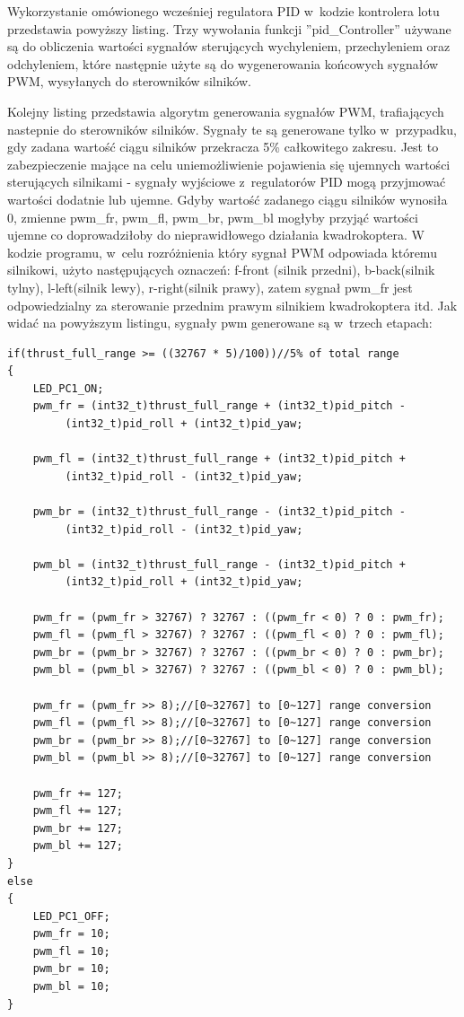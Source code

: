 Wykorzystanie omówionego wcześniej regulatora PID w~kodzie kontrolera lotu przedstawia powyższy listing. Trzy wywołania funkcji ''pid\_Controller'' używane są do obliczenia wartości sygnałów sterujących wychyleniem, przechyleniem oraz odchyleniem, które następnie użyte są do wygenerowania końcowych sygnałów PWM, wysyłanych do sterowników silników. 


Kolejny listing przedstawia algorytm generowania sygnałów PWM, trafiających nastepnie do sterowników silników. Sygnały te są generowane tylko w~przypadku, gdy zadana wartość ciągu silników przekracza 5\% całkowitego zakresu. Jest to zabezpieczenie mające na celu uniemożliwienie pojawienia się ujemnych wartości sterujących silnikami - sygnały wyjściowe z~regulatorów PID mogą przyjmować wartości dodatnie lub ujemne. Gdyby wartość zadanego ciągu silników wynosiła 0, zmienne pwm\_fr, pwm\_fl, pwm\_br, pwm\_bl mogłyby przyjąć wartości ujemne co doprowadziłoby do nieprawidłowego działania kwadrokoptera. W kodzie programu, w~celu rozróżnienia który sygnał PWM odpowiada któremu silnikowi, użyto następujących oznaczeń: f-front (silnik przedni), b-back(silnik tylny), l-left(silnik lewy), r-right(silnik prawy), zatem sygnał pwm\_fr jest odpowiedzialny za sterowanie przednim prawym silnikiem kwadrokoptera itd. Jak widać na powyższym listingu, sygnały pwm generowane są w~trzech etapach:

\begin{lstlisting}
if(thrust_full_range >= ((32767 * 5)/100))//5% of total range
{
	LED_PC1_ON;
	pwm_fr = (int32_t)thrust_full_range + (int32_t)pid_pitch - 
		 (int32_t)pid_roll + (int32_t)pid_yaw;
	
	pwm_fl = (int32_t)thrust_full_range + (int32_t)pid_pitch + 
		 (int32_t)pid_roll - (int32_t)pid_yaw;
	
	pwm_br = (int32_t)thrust_full_range - (int32_t)pid_pitch - 
		 (int32_t)pid_roll - (int32_t)pid_yaw;
	
	pwm_bl = (int32_t)thrust_full_range - (int32_t)pid_pitch + 
		 (int32_t)pid_roll + (int32_t)pid_yaw;

	pwm_fr = (pwm_fr > 32767) ? 32767 : ((pwm_fr < 0) ? 0 : pwm_fr); 
	pwm_fl = (pwm_fl > 32767) ? 32767 : ((pwm_fl < 0) ? 0 : pwm_fl); 
	pwm_br = (pwm_br > 32767) ? 32767 : ((pwm_br < 0) ? 0 : pwm_br);
	pwm_bl = (pwm_bl > 32767) ? 32767 : ((pwm_bl < 0) ? 0 : pwm_bl);

	pwm_fr = (pwm_fr >> 8);//[0~32767] to [0~127] range conversion
	pwm_fl = (pwm_fl >> 8);//[0~32767] to [0~127] range conversion
	pwm_br = (pwm_br >> 8);//[0~32767] to [0~127] range conversion
	pwm_bl = (pwm_bl >> 8);//[0~32767] to [0~127] range conversion

	pwm_fr += 127;
	pwm_fl += 127;
	pwm_br += 127;
	pwm_bl += 127;
}
else
{
	LED_PC1_OFF;
	pwm_fr = 10;
	pwm_fl = 10;
	pwm_br = 10;
	pwm_bl = 10;
}
\end{lstlisting}


